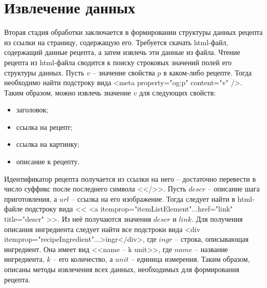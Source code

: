 \section{Извлечение данных}
Вторая стадия обработки заключается в формировании структуры данных рецепта из ссылки на страницу, содержащую его.
Требуется скачать html-файл, содержащий данные рецепта, а затем извлечь эти данные из файла.
Чтение рецепта из html-файла сводится к поиску строковых значений полей его структуры данных.
Пусть $v$ -- значение свойства $p$ в каком-либо рецепте.
Тогда необходимо найти подстроку вида
<meta property="og:p" content="v" />.
Таким образом, можно извлечь значение $v$ для следующих свойств:
\begin{itemize}
    \item заголовок;
    \item ссылка на рецепт;
    \item ссылка на картинку;
    \item описание к рецепту.
\end{itemize}
Идентификатор рецепта получается из ссылки на него -- достаточно перевести в число суффикс после последнего символа <</>>.
Пусть $descr$ -- описание шага приготовления, а $url$ -- ссылка на его изображение.
Тогда следует найти в html-файле подстроку вида
<< <a itemprop="itemListElement"...href="link" title="descr" >>.
Из неё получаются значения $descr$ и $link$.
Для получения описания ингредиента следует найти все подстроки вида <div itemprop="recipeIngredient"...>ingr</div>, где $ingr$ -- строка, описывающая ингредиент.
Она имеет вид <<name -- k unit>>, где $name$ -- название ингредиента, $k$ -- его количество, а $unit$ -- единица измерения.
Таким образом, описаны методы извлечения всех данных, необходимых для формирования рецепта.

